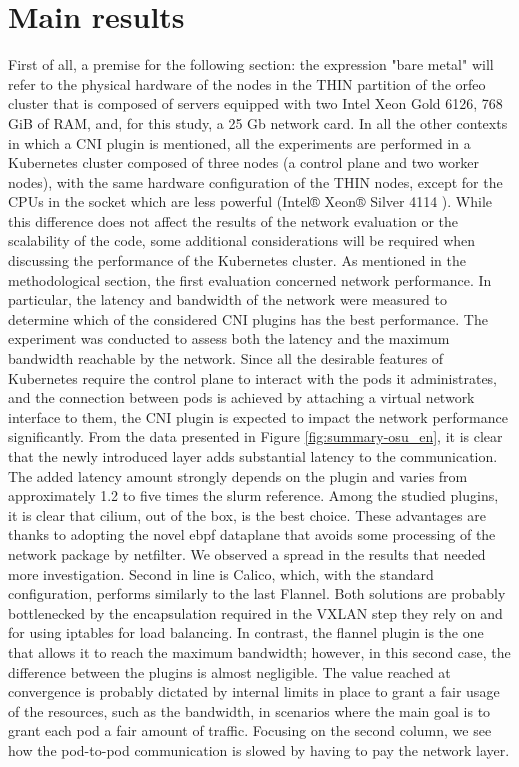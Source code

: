 \section*{Main results}


First of all, a premise for the following section: the expression "bare metal"
will refer to the physical hardware of the nodes in the THIN partition of the
orfeo cluster that is composed of servers equipped with two Intel Xeon Gold
6126, 768 GiB of RAM, and, for this study, a 25 Gb network card. In all the
other contexts in which a CNI plugin is mentioned, all the experiments are
performed in a Kubernetes cluster composed of three nodes (a control plane and
two worker nodes), with the same hardware configuration of the THIN nodes,
except for the CPUs in the socket which are less powerful (Intel® Xeon® Silver
4114 ). While this difference does not affect the results of the network
evaluation or the scalability of the code, some additional considerations will
be required when discussing the performance of the Kubernetes cluster.
As mentioned in the methodological section, the first evaluation concerned
network performance. In particular, the latency and bandwidth of the network
were measured to determine which of the considered CNI plugins has the best
performance. The experiment was conducted to assess both the latency and the
maximum bandwidth reachable by the network. Since all the desirable features of
Kubernetes require the control plane to interact with the pods it administrates,
and the connection between pods is achieved by attaching a virtual network
interface to them, the CNI plugin is expected to impact the network performance
significantly.
From the data presented in Figure \ref{fig:summary-osu_en}, it is clear that the
newly introduced layer adds substantial latency to the communication. The added
latency amount strongly depends on the plugin and varies from approximately 1.2
to five times the slurm reference. Among the studied plugins, it is clear that
cilium, out of the box, is the best choice. These advantages are thanks to
adopting the novel ebpf dataplane that avoids some processing of the network
package by netfilter. We observed a spread in the results that needed more
investigation. Second in line is Calico, which, with the standard configuration,
performs similarly to the last Flannel. Both solutions are probably bottlenecked
by the encapsulation required in the VXLAN step they rely on and for using
iptables for load balancing. In contrast, the flannel plugin is the one that
allows it to reach the maximum bandwidth; however, in this second case, the
difference between the plugins is almost negligible. The value reached at
convergence is probably dictated by internal limits in place to grant a fair
usage of the resources, such as the bandwidth, in scenarios where the main goal
is to grant each pod a fair amount of traffic. Focusing on the second column, we
see how the pod-to-pod communication is slowed by having to pay the network
layer.

